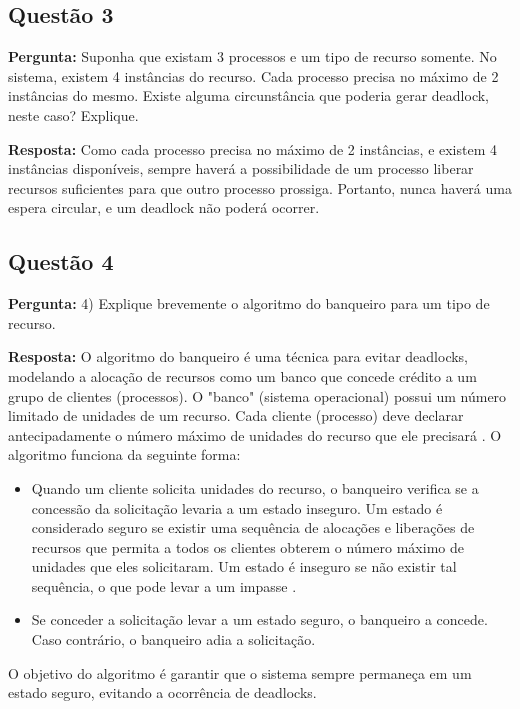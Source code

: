 \documentclass{article}
\begin{document}
\subsection{Questão 3}

\textbf{Pergunta:} Suponha que existam 3 processos e um tipo de recurso somente. No sistema, existem 4 instâncias do recurso. Cada processo precisa no máximo de 2 instâncias do mesmo. Existe alguma circunstância que poderia gerar deadlock, neste caso? Explique.\newline

\textbf{Resposta: } Como cada processo precisa no máximo de 2 instâncias, e existem 4 instâncias disponíveis, sempre haverá a possibilidade de um processo liberar recursos suficientes para que outro processo prossiga. Portanto, nunca haverá uma espera circular, e um deadlock não poderá ocorrer.

\subsection{Questão 4}

\textbf{Pergunta:} 4)  Explique brevemente o algoritmo do banqueiro para um tipo de recurso.\newline

\textbf{Resposta:} O algoritmo do banqueiro é uma técnica para evitar deadlocks, modelando a alocação de recursos como um banco que concede crédito a um grupo de clientes (processos). O "banco" (sistema operacional) possui um número limitado de unidades de um recurso. Cada cliente (processo) deve declarar antecipadamente o número máximo de unidades do recurso que ele precisará \parencite[p. 313]{tanenbaum2021}. O algoritmo funciona da seguinte forma:

\begin{itemize}
  \item Quando um cliente solicita unidades do recurso, o banqueiro verifica se a concessão da solicitação levaria a um estado inseguro. Um estado é considerado seguro se existir uma sequência de alocações e liberações de recursos que permita a todos os clientes obterem o número máximo de unidades que eles solicitaram. Um estado é inseguro se não existir tal sequência, o que pode levar a um impasse \parencite[p. 312]{tanenbaum2021}.
  \item Se conceder a solicitação levar a um estado seguro, o banqueiro a concede. Caso contrário, o banqueiro adia a solicitação.
\end{itemize}

O objetivo do algoritmo é garantir que o sistema sempre permaneça em um estado seguro, evitando a ocorrência de deadlocks.

\printbibliography %
\end{document}
